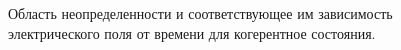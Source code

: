 \begin{figure}
\centering



\caption{Область неопределенности и соответствующее им зависимость
  электрического поля от времени для когерентное состояния.}
\label{figPart3Squeezed_1}
\end{figure}
